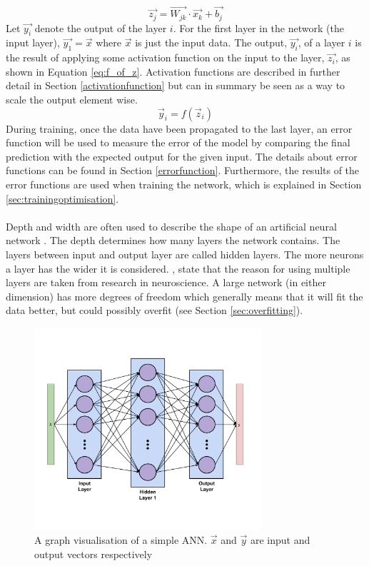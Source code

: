 \begin{equation}\label{eq:z}
    \vec{z_j} = \vec{W_{jk}} \cdot \vec{x_k} + \vec{b_j}
\end{equation}
Let $\vec{y_i}$ denote the output of the layer $i$. For the first layer in the network (the input layer), $\vec{y_1}=\vec{x}$ where $\vec{x}$ is just the input data. The output, $\vec{y_i}$, of a layer $i$ is the result of applying some activation function on the input to the layer, $\vec{z_i}$, as shown in Equation \ref{eq:f_of_z}. Activation functions are described in further detail in Section \ref{activationfunction} but can in summary be seen as a way to scale the output element wise.
\begin{equation}\label{eq:f_of_z}
    \vec{y}_i = f(\vec{z}_i)
\end{equation}
During training, once the data have been propagated to the last layer, an error function will be used to measure the error of the model by comparing the final prediction with the expected output for the given input. The details about error functions can be found in Section \ref{errorfunction}. Furthermore, the results of the error functions are used when training the network, which is explained in Section \ref{sec:trainingoptimisation}. 
\\\\
Depth and width are often used to describe the shape of an artificial neural network \parencite{Goodfellow-et-al-2016}. The depth determines how many layers the network contains. The layers between input and output layer are called hidden layers. The more neurons a layer has the wider it is considered. \cite{Goodfellow-et-al-2016}, state that the reason for using multiple layers are taken from research in neuroscience. A large network (in either dimension) has more degrees of freedom which generally means that it will fit the data better, but could possibly overfit (see Section \ref{sec:overfitting}).

\begin{figure}[h]
    \centering
    \includegraphics[width=0.75\textwidth]{figure/ann/simple_ann}
    \caption{A graph visualisation of a simple ANN. $\vec{x}$ and $\vec{y}$ are input and output vectors respectively}
    \label{fig:simple_ann}
\end{figure}

